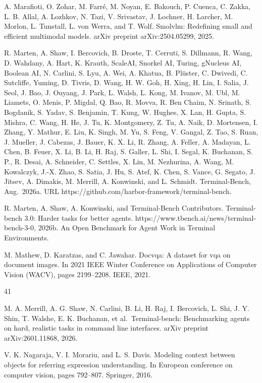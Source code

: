 \documentclass[
  10
]{article}
\begin{document}
A. Marafioti, O. Zohar, M. Farré, M. Noyan, E. Bakouch, P. Cuenca, C.
Zakka, L. B. Allal, A. Lozhkov, N. Tazi, V. Srivastav, J. Lochner, H.
Larcher, M. Morlon, L. Tunstall, L. von Werra, and T. Wolf. Smolvlm:
Redefining small and efficient multimodal models. arXiv preprint
arXiv:2504.05299, 2025.

R. Marten, A. Shaw, I. Bercovich, B. Droste, T. Cerruti, S. Dillmann, R.
Wang, D. Wahdany, A. Hart, K. Krauth, ScaleAI, Snorkel AI, Turing,
gNucleus AI, Boolean AI, N. Carlini, S. Lyu, A. Wei, A. Khatua, B.
Plüster, C. Dwivedi, C. Sutcliffe, Yuming, D. Tivris, D. Wang, H. W.
Goh, H. Xing, H. Lin, I. Salia, J. Seol, J. Bao, J. Ouyang, J. Park, L.
Walsh, L. Kong, M. Ivanov, M. Ubl, M. Liamets, O. Menis, P. Migdal, Q.
Bao, R. Movva, R. Ben Chaim, N. Srinath, S. Bogdanik, S. Yadav, S.
Benjamin, T. Kung, W. Hughes, X. Lan, H. Gupta, S. Mishra, C. Wang, H.
He, J. Tu, K. Montgomery, Z. Tu, A. Naik, D. Mortensen, I. Zhang, Y.
Mathur, E. Liu, K. Singh, M. Yu, S. Feng, V. Gangal, Z. Tao, S. Ruan, J.
Mueller, J. Cabezas, J. Bauer, K. X. Li, R. Zhang, A. Feller, A.
Madayan, L. Chen, B. Feuer, X. Li, B. Li, H. Raj, S. Galler, L. Shi, I.
Segal, K. Buchanan, S. P., R. Desai, A. Schneider, C. Settles, X. Lin,
M. Nezhurina, A. Wang, M. Kowalczyk, J.-X. Zhao, S. Satia, J. Hu, S.
Atef, K. Chen, S. Vance, G. Segato, J. Jitsev, A. Dimakis, M. Merrill,
A. Konwinski, and L. Schmidt. Terminal-Bench, Aug.~2026a. URL
https://github.com/harbor-framework/terminal-bench.

R. Marten, A. Shaw, A. Konwinski, and Terminal-Bench Contributors.
Terminal-bench 3.0: Harder tasks for better agents.
https://www.tbench.ai/news/terminal-bench-3-0, 2026b. An Open Benchmark
for Agent Work in Terminal Environments.

M. Mathew, D. Karatzas, and C. Jawahar. Docvqa: A dataset for vqa on
document images. In 2021 IEEE Winter Conference on Applications of
Computer Vision (WACV), pages 2199--2208. IEEE, 2021.

41

M. A. Merrill, A. G. Shaw, N. Carlini, B. Li, H. Raj, I. Bercovich, L.
Shi, J. Y. Shin, T. Walshe, E. K. Buchanan, et al.~Terminal-bench:
Benchmarking agents on hard, realistic tasks in command line interfaces.
arXiv preprint arXiv:2601.11868, 2026.

V. K. Nagaraja, V. I. Morariu, and L. S. Davis. Modeling context between
objects for referring expression understanding. In European conference
on computer vision, pages 792--807. Springer, 2016.
\end{document}
